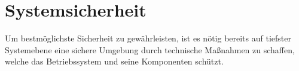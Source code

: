 \section{Systemsicherheit}\label{sec:systemsec}
	Um bestmöglichste Sicherheit zu gewährleisten, ist es nötig bereits auf
	tiefster Systemebene eine sichere Umgebung durch technische Maßnahmen
	zu schaffen, welche das Betriebssystem und seine Komponenten schützt.
